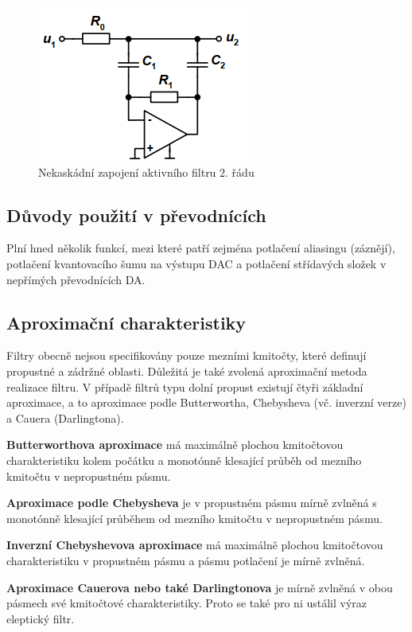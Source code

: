    \begin{figure}[h]
   \begin{center}
     \includegraphics[scale=0.8]{images/Nekas.png}
   \end{center}
   \caption{Nekaskádní zapojení aktivního filtru 2. řádu}
   \label{fig:nekas}
  \end{figure}

\subsection{Důvody použití v převodnících}  
Plní hned několik funkcí, mezi které patří zejména potlačení aliasingu (záznějí), potlačení kvantovacího šumu na výstupu DAC a potlačení střídavých složek v nepřímých převodnících DA.
\subsection{Aproximační charakteristiky}

Filtry obecně nejsou specifikovány pouze mezními kmitočty, které definují propustné a zádržné oblasti. Důležitá je také zvolená aproximační metoda realizace filtru. V případě filtrů typu dolní propust existují čtyři základní aproximace, a to aproximace podle Butterwortha, Chebysheva (vč. inverzní verze) a Cauera (Darlingtona).

\textbf{Butterworthova aproximace} má maximálně plochou kmitočtovou charakteristiku kolem počátku a monotónně klesající průběh od mezního kmitočtu v nepropustném pásmu.

\textbf{Aproximace podle Chebysheva} je v propustném pásmu mírně zvlněná s monotónně klesající průběhem od mezního kmitočtu v nepropustném pásmu. 

\textbf{Inverzní Chebyshevova aproximace} má maximálně plochou kmitočtovou charakteristiku v propustném pásmu a pásmu potlačení je mírně zvlněná. 

\textbf{Aproximace Cauerova nebo také Darlingtonova} je mírně zvlněná v obou pásmech své kmitočtové charakteristiky. Proto se také pro ni ustálil výraz eleptický filtr.

